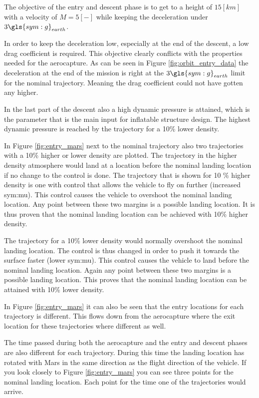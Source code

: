 The objective of the entry and descent phase is to get to a height of $15 \left[km\right]$ with a velocity of $M = 5 \left[-\right]$ while keeping the deceleration under $3 \gls{sym:g}_{earth}$.

In order to keep the deceleration low, especially at the end of the descent, a low drag coefficient is required. This objective clearly conflicts with the properties needed for the aerocapture. As can be seen in Figure \ref{fig:orbit_entry_data} the deceleration at the end of the mission is right at the $3 \gls{sym:g}_{earth}$ limit for the nominal trajectory. Meaning the drag coefficient could not have gotten any higher.

In the last part of the descent also a high dynamic pressure is attained, which is the parameter that is the main input for inflatable structure design. The highest dynamic pressure is reached by the trajectory for a 10\% lower density.

In Figure \ref{fig:entry_mars} next to the nominal trajectory also two trajectories with a 10\% higher or lower density are plotted. The trajectory in the higher density atmosphere would land at a location before the nominal landing location if no change to the control is done. The trajectory that is shown for 10 \% higher density is one with control that allows the vehicle to fly on further (increased \gls{sym:mu}). This control causes the vehicle to overshoot the nominal landing location. Any point between these two margins is a possible landing location. It is thus proven that the nominal landing location can be achieved with 10\% higher density.

The trajectory for a 10\% lower density would normally overshoot the nominal landing location. The control is thus changed in order to push it towards the surface faster (lower \gls{sym:mu}). This control causes the vehicle to land before the nominal landing location. Again any point between these two margins is a possible landing location. This proves that the nominal landing location can be attained with 10\% lower density.

In Figure \ref{fig:entry_mars} it can also be seen that the entry locations for each trajectory is different. This flows down from the aerocapture where the exit location for these trajectories where different as well.

The time passed during both the aerocapture and the entry and descent phases are also different for each trajectory. During this time the landing location has rotated with Mars in the same direction as the flight direction of the vehicle. If you look closely to Figure \ref{fig:entry_mars} you can see three points for the nominal landing location. Each point for the time one of the trajectories would arrive.

